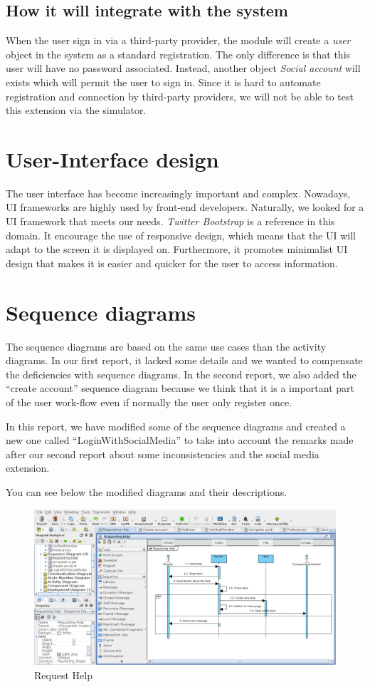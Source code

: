 \documentclass[11pt, a4paper]{article}   	%
\begin{document}
\subsection*{How it will integrate with the system}
When the user sign in via a third-party provider, the module will create a \textit{user} object in the system as a standard registration.
The only difference is that this user will have no password associated.
Instead, another object \textit{Social account} will exists which will permit the user to sign in.
Since it is hard to automate registration and connection by third-party providers, we will not be able to test this extension via the simulator.


\section{User-Interface design}
The user interface has become increasingly important and complex.
Nowadays, UI frameworks are highly used by front-end developers.
Naturally, we looked for a UI framework that meets our needs.
\textit{Twitter Bootstrap} is a reference in this domain.
It encourage the use of responsive design, which means that the UI will adapt to the screen it is displayed on.
Furthermore, it promotes minimalist UI design that makes it is easier and quicker for the user to access information.


\section{Sequence diagrams}

The sequence diagrams are based on the same use cases than the activity diagrams. In our first report, it lacked some details and we wanted
to compensate the deficiencies with sequence diagrams. In the second report, we also added the \enquote{create account} sequence diagram because we think that it is a important part of the user work-flow even if normally the user only register once.

In this report, we have modified some of the sequence diagrams and created a new one called \enquote{LoginWithSocialMedia} to take into account the remarks made after our second report about some inconsistencies and the social media extension.

You can see below the modified diagrams and their descriptions.

\begin{figure}[!ht]
   \includegraphics[width=\textwidth]{requestHelp.png}
   \caption{\label{requestHelp} Request Help}
\end{figure}
\end{document}
